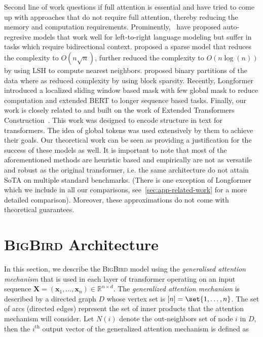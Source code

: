 Second line of work questions if full attention is essential and have tried to come up with approaches that do not require full attention, thereby reducing the memory and computation requirements.
Prominently,~\citet{dai2019transformer, sukhbaatar2019adaptive, rae2019compressive} have proposed auto-regresive models that work well for left-to-right language modeling but suffer in tasks which require bidirectional context.
\citet{child2019generating} proposed a sparse model that reduces the complexity to $O(n\sqrt{n})$, \citet{kitaev2019reformer} further reduced the complexity to $O(n\log(n))$ by using LSH to compute  nearest neighbors. 
\citet{ye2019bp} proposed binary partitions of the data where as \citet{qiu2019blockwise} reduced complexity by using block sparsity. Recently, Longformer \cite{beltagy2020longformer} introduced a localized sliding window based mask with few global mask to reduce computation and extended BERT to longer sequence based tasks. Finally, our work is closely related to and built on the work of Extended Transformers Construction~\citep{ainslie2020etc}. This work was designed to encode structure in text for transformers. The idea of global tokens was used extensively by them to achieve their goals. Our theoretical work can be seen as providing a  justification for the success of these models as well. It is important to note that most of the aforementioned methods are heuristic based and empirically are not as versatile and robust as the original transformer, i.e. the same architecture do not attain SoTA on multiple standard benchmarks. (There is one exception of Longformer which we include in all our comparisons, see~\ref{sec:app-related-work} for a more detailed comparison). Moreover, these approximations do not come with theoretical guarantees. 

\section{\textsc{BigBird} Architecture}
\label{sec:arch}
In this section, we describe the \textsc{BigBird} model using the \emph{generalised attention mechanism} that is used in each layer of transformer operating on an input sequence ${\bm{X}} = ({\bm{x}}_1, ..., {\bm{x}}_n) \in \mathbb{R}^{n\times d}$. The \emph{generalized attention mechanism} is described by a directed graph $D$ whose vertex set is $[n] = \set{1,\dots,n}$. 
The set of arcs (directed edges) represent the set of inner products that the attention mechanism will consider. Let $N(i)$ denote the out-neighbors set of node $i$ in $D$, then the $i^\text{th}$ output vector of the generalized attention mechanism is defined as \useshortskip

